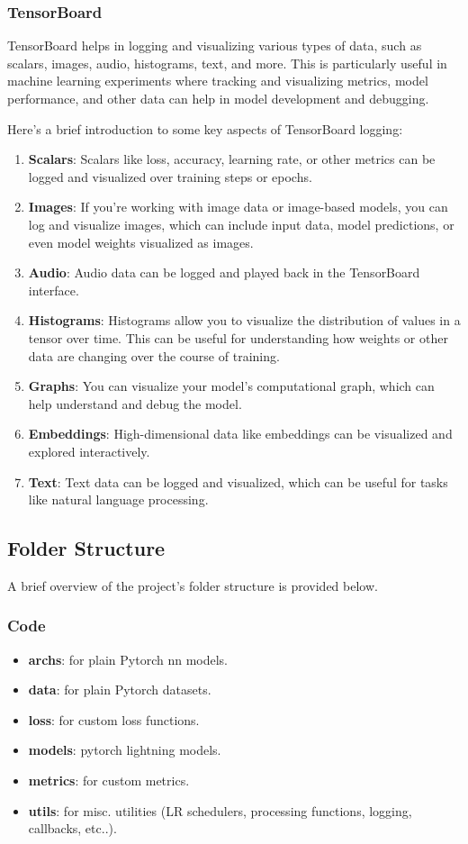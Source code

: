 \subsubsection{TensorBoard}
TensorBoard helps in logging and visualizing various types of data, such as scalars, images, audio, histograms, text, and more. This is particularly useful in machine learning experiments where tracking and visualizing metrics, model performance, and other data can help in model development and debugging.

Here's a brief introduction to some key aspects of TensorBoard logging:
\begin{enumerate}
    \item \textbf{Scalars}: Scalars like loss, accuracy, learning rate, or other metrics can be logged and visualized over training steps or epochs.
    \item \textbf{Images}: If you're working with image data or image-based models, you can log and visualize images, which can include input data, model predictions, or even model weights visualized as images.
    \item \textbf{Audio}: Audio data can be logged and played back in the TensorBoard interface.
    \item \textbf{Histograms}: Histograms allow you to visualize the distribution of values in a tensor over time. This can be useful for understanding how weights or other data are changing over the course of training.
    \item \textbf{Graphs}: You can visualize your model's computational graph, which can help understand and debug the model.
    \item \textbf{Embeddings}: High-dimensional data like embeddings can be visualized and explored interactively.
    \item \textbf{Text}: Text data can be logged and visualized, which can be useful for tasks like natural language processing.
\end{enumerate}

\subsection{Folder Structure}
A brief overview of the project's folder structure is provided below.

\subsubsection{Code}
\begin{itemize}
    \item \textbf{archs}: for plain Pytorch nn models.
    \item \textbf{data}: for plain Pytorch datasets.
    \item \textbf{loss}: for custom loss functions.
    \item \textbf{models}: pytorch lightning models.
    \item \textbf{metrics}: for custom metrics.
    \item \textbf{utils}: for misc. utilities (LR schedulers, processing functions, logging, callbacks, etc..).
\end{itemize}

